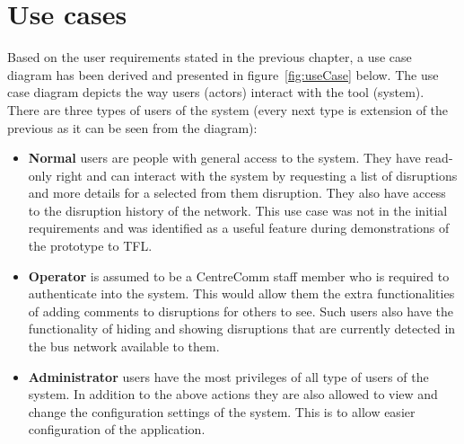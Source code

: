 \section{Use cases}
Based on the user requirements stated in the previous chapter, a use case diagram has been derived and presented in figure~\ref{fig:useCase} below. The use case diagram depicts the way users (actors) interact with the tool (system). There are three types of users of the system (every next type is extension of the previous as it can be seen from the diagram):
\begin{itemize}
	\item \textbf{Normal} users are people with general access to the system. They have read-only right and can interact with the system by requesting a list of disruptions and more details for a selected from them disruption. They also have access to the disruption history of the network. This use case was not in the initial requirements and was identified as a useful feature during demonstrations of the prototype to TFL.
	\item \textbf{Operator} is assumed to be a CentreComm staff member who is required to authenticate into the system. This would allow them the extra functionalities of adding comments to disruptions for others to see. Such users also have the functionality of hiding and showing disruptions that are currently detected in the bus network available to them.
	\item \textbf{Administrator} users have the most privileges of all type of users of the system. In addition to the above actions they are also allowed to view and change the configuration settings of the system. This is to allow easier configuration of the application.
\end{itemize}

